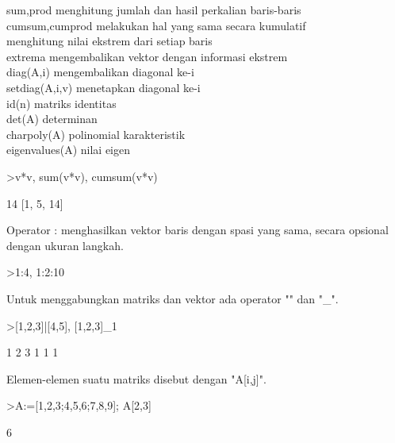 \documentclass[a4paper,10pt]{article}
\begin{document}
\begin{eulernotebook}
\begin{eulercomment}
\begin{eulercomment}
\begin{eulercomment}
\begin{eulercomment}
\begin{eulercomment}
\begin{eulercomment}
\begin{eulercomment}
sum,prod menghitung jumlah dan hasil perkalian baris-baris\\
cumsum,cumprod melakukan hal yang sama secara kumulatif\\
menghitung nilai ekstrem dari setiap baris\\
extrema mengembalikan vektor dengan informasi ekstrem\\
diag(A,i) mengembalikan diagonal ke-i\\
setdiag(A,i,v) menetapkan diagonal ke-i\\
id(n) matriks identitas\\
det(A) determinan\\
charpoly(A) polinomial karakteristik\\
eigenvalues(A) nilai eigen
\end{eulercomment}
\begin{eulerprompt}
>v*v, sum(v*v), cumsum(v*v)
\end{eulerprompt}
\begin{euleroutput}
  [1,  4,  9]
  14
  [1,  5,  14]
\end{euleroutput}
\begin{eulercomment}
Operator : menghasilkan vektor baris dengan spasi yang sama, secara
opsional dengan ukuran langkah.
\end{eulercomment}
\begin{eulerprompt}
>1:4, 1:2:10
\end{eulerprompt}
\begin{euleroutput}
  [1,  2,  3,  4]
  [1,  3,  5,  7,  9]
\end{euleroutput}
\begin{eulercomment}
Untuk menggabungkan matriks dan vektor ada operator "\textbar{}" dan "\_".
\end{eulercomment}
\begin{eulerprompt}
>[1,2,3]|[4,5], [1,2,3]_1
\end{eulerprompt}
\begin{euleroutput}
  [1,  2,  3,  4,  5]
              1             2             3 
              1             1             1 
\end{euleroutput}
\begin{eulercomment}
Elemen-elemen suatu matriks disebut dengan "A[i,j]".
\end{eulercomment}
\begin{eulerprompt}
>A:=[1,2,3;4,5,6;7,8,9]; A[2,3]
\end{eulerprompt}
\begin{euleroutput}
  6
\end{euleroutput}

\end{eulercomment}
\end{eulercomment}
\end{eulercomment}
\end{eulercomment}
\end{eulercomment}
\end{eulercomment}
\end{eulernotebook}
\end{document}
